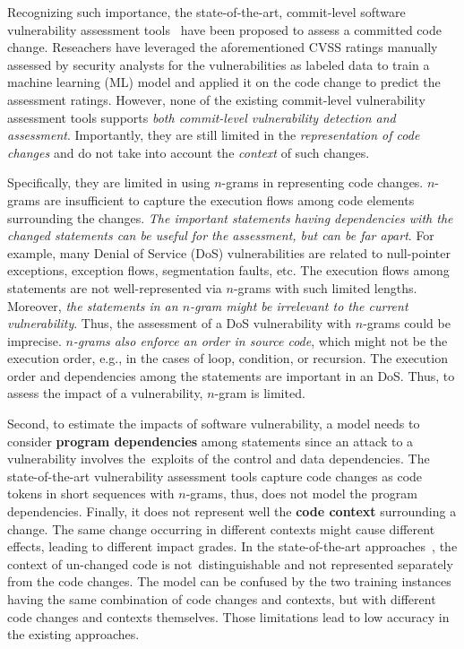 Recognizing such importance, the state-of-the-art, commit-level
software vulnerability assessment tools~\cite{deepCVA-ase21} have been
proposed to assess a committed code change. Reseachers have leveraged
the aforementioned CVSS ratings manually assessed by security analysts
for the vulnerabilities as labeled data to train a machine learning
(ML) model and applied it on the code change to predict the assessment
ratings. However, none of the existing commit-level vulnerability
assessment tools supports {\em both commit-level vulnerability
  detection and assessment}. Importantly, they are still limited in
the {\em representation of code changes} and do not take into account
the {\em context} of such changes.

Specifically, they are limited in using $n$-grams in representing code
changes. $n$-grams are insufficient to capture the execution flows
among code elements surrounding the changes. {\em The important
  statements having dependencies with the changed statements can be
  useful for the assessment, but can be far apart}. For example, many
Denial of Service (DoS) vulnerabilities are related to null-pointer
exceptions, exception flows, segmentation faults, etc. The execution
flows among statements are not well-represented via $n$-grams with
such limited lengths. Moreover, {\em the statements in an $n$-gram
  might be irrelevant to the current vulnerability}. Thus, the
assessment of a DoS vulnerability with $n$-grams could be
imprecise. {\em $n$-grams also enforce an order in source code}, which
might not be the execution order, e.g., in the cases of loop,
condition, or recursion. The execution order and dependencies among
the statements are important in an DoS. Thus, to assess the impact of
a vulnerability, $n$-gram is limited.

Second, to estimate the impacts of software vulnerability, a model
needs to consider {\bf program dependencies} among statements since an
attack to a vulnerability involves the~exploits of the control and
data dependencies. The state-of-the-art vulnerability assessment tools
capture code changes as code tokens in short sequences with $n$-grams,
thus, does not model the program dependencies. Finally, it
does not represent well the {\bf code context} surrounding a
change. The same change occurring in different contexts might cause
different effects, leading to different impact grades. In the
state-of-the-art approaches~\cite{deepCVA-ase21}, the context of
un-changed code is not~distinguishable and not represented
separately from the code changes. The model can be confused by the two
training instances having the same combination of code changes and
contexts, but with different code changes and contexts
themselves. Those limitations lead to low accuracy in the
existing approaches.

